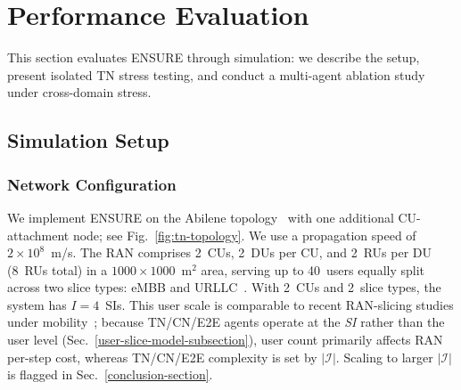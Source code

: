 \documentclass[12pt,lettersize,journal,onecolumn]{IEEEtran}
\begin{document}
\section{Performance Evaluation} \label{sec:results}

This section evaluates ENSURE through simulation: we describe the setup, present isolated TN stress testing, and conduct a multi-agent ablation study under cross-domain stress.

\subsection{Simulation Setup}
\label{subsec:setup}

\subsubsection{Network Configuration}
We implement ENSURE on the Abilene topology~\cite{networks10orlowski} with one additional CU-attachment node; see Fig.~\ref{fig:tn-topology}. We use a propagation speed of $2{\times}10^8$~m/s. The RAN comprises 2~CUs, 2~DUs per CU, and 2~RUs per DU (8~RUs total) in a $1000{\times}1000$~m$^2$ area, serving up to 40~users equally split across two slice types: eMBB and URLLC~\cite{tvt23choi}. With 2~CUs and 2~slice types, the system has $I=4$~SIs. This user scale is comparable to recent RAN-slicing studies under mobility~\cite{tvt23choi,camad24ebrahimi}; because TN/CN/E2E agents operate at the \emph{SI} rather than the user level (Sec.~\ref{user-slice-model-subsection}), user count primarily affects RAN per-step cost, whereas TN/CN/E2E complexity is set by $|\mathcal{I}|$. Scaling to larger $|\mathcal{I}|$ is flagged in Sec.~\ref{conclusion-section}. 
\end{document}
